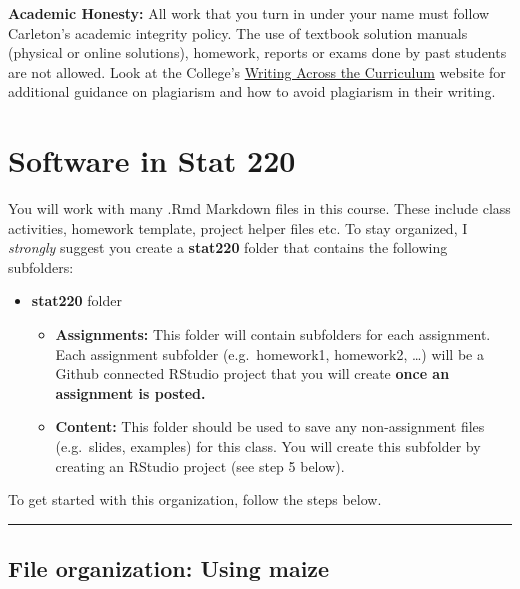 \documentclass[
]{book}
\providecommand{\tightlist}{%
  \setlength{\itemsep}{0pt}\setlength{\parskip}{0pt}}
\begin{document}
\textbf{Academic Honesty:} All work that you turn in under your name must
follow Carleton's academic integrity policy. The use of textbook
solution manuals (physical or online solutions), homework, reports or
exams done by past students are not allowed. Look at the College's
\href{https://www.carleton.edu/writing/plagiarism/}{Writing Across the Curriculum} website for
additional guidance on plagiarism and how to avoid plagiarism in their
writing.

\hypertarget{software}{%
\chapter{Software in Stat 220}\label{software}}

You will work with many .Rmd Markdown files in this course. These include class activities, homework template, project helper files etc. To stay organized, I \emph{strongly} suggest you create a \textbf{stat220} folder that contains the following subfolders:

\begin{itemize}
\tightlist
\item
  \textbf{stat220} folder

  \begin{itemize}
  \item
    \textbf{Assignments:} This folder will contain subfolders for each
    assignment. Each assignment subfolder (e.g.~homework1,
    homework2, \ldots) will be a Github connected RStudio project that
    you will create \textbf{once an assignment is posted.}
  \item
    \textbf{Content:} This folder should be used to save any
    non-assignment files (e.g.~slides, examples) for this class. You
    will create this subfolder by creating an RStudio project (see
    step 5 below).
  \end{itemize}
\end{itemize}

To get started with this organization, follow the steps below.

\begin{center}\rule{0.5\linewidth}{0.5pt}\end{center}

\hypertarget{file-organization-using-maize}{%
\section{File organization: Using maize}\label{file-organization-using-maize}}
\end{document}
